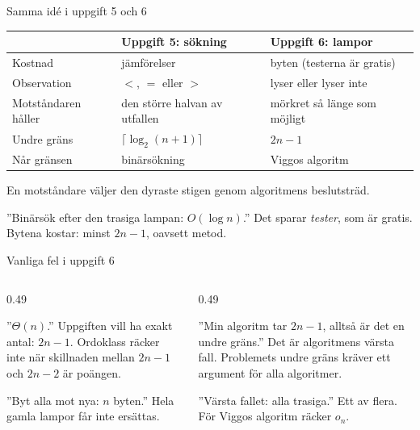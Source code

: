 \begin{frame}{Samma idé i uppgift 5 och 6}
\footnotesize
\renewcommand{\arraystretch}{1.12}
\begin{tabularx}{\textwidth}{@{}lXX@{}}
\toprule
& \textbf{Uppgift 5: sökning} & \textbf{Uppgift 6: lampor}\\
\midrule
Kostnad & jämförelser & byten (testerna är gratis)\\
Observation & $<$, $=$ eller $>$ & lyser eller lyser inte\\
Motståndaren håller & den större halvan av utfallen & mörkret så länge som möjligt\\
Undre gräns & $\lceil\log_2(n+1)\rceil$ & $2n-1$\\
Når gränsen & binärsökning & Viggos algoritm\\
\bottomrule
\end{tabularx}
\smallskip

\small En motståndare väljer den dyraste stigen genom algoritmens beslutsträd.
\vfill
\begin{missbox}[fontupper=\footnotesize]
”Binärsök efter den trasiga lampan: $O(\log n)$.” Det sparar \emph{tester}, som är gratis.
Bytena kostar: minst $2n-1$, oavsett metod.
\end{missbox}
\end{frame}

\begin{frame}{Vanliga fel i uppgift 6}
\begin{columns}[T]
\begin{column}{0.49\textwidth}
\begin{missbox}[fontupper=\footnotesize]
”$\Theta(n)$.” Uppgiften vill ha exakt antal: $2n-1$. Ordoklass räcker inte när skillnaden
mellan $2n-1$ och $2n-2$ är poängen.
\end{missbox}
\begin{missbox}[fontupper=\footnotesize]
”Byt alla mot nya: $n$ byten.” Hela gamla lampor får inte ersättas.
\end{missbox}
\end{column}
\begin{column}{0.49\textwidth}
\begin{missbox}[fontupper=\footnotesize]
”Min algoritm tar $2n-1$, alltså är det en undre gräns.” Det är algoritmens värsta fall.
Problemets undre gräns kräver ett argument för alla algoritmer.
\end{missbox}
\begin{missbox}[fontupper=\footnotesize]
”Värsta fallet: alla trasiga.” Ett av flera. För Viggos algoritm räcker $o_n$.
\end{missbox}
\end{column}
\end{columns}
\end{frame}

